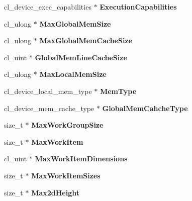 \begin{DoxyCompactItemize}
cl\+\_\+device\+\_\+exec\+\_\+capabilities $\ast$ {\bfseries Execution\+Capabilities}
\item 
\hypertarget{structdevices_a5ddc90720316ce7161f26263d83d4693}{}\label{structdevices_a5ddc90720316ce7161f26263d83d4693} 
cl\+\_\+ulong $\ast$ {\bfseries Max\+Global\+Mem\+Size}
\item 
\hypertarget{structdevices_a75e0abd182f71d9ccdacaefa759183e1}{}\label{structdevices_a75e0abd182f71d9ccdacaefa759183e1} 
cl\+\_\+ulong $\ast$ {\bfseries Max\+Global\+Mem\+Cache\+Size}
\item 
\hypertarget{structdevices_a6d9b4864fa0e86b5cfac50c34ed49bd3}{}\label{structdevices_a6d9b4864fa0e86b5cfac50c34ed49bd3} 
cl\+\_\+uint $\ast$ {\bfseries Global\+Mem\+Line\+Cache\+Size}
\item 
\hypertarget{structdevices_a55b41f48a237ce3e06b0d5f68f518ae9}{}\label{structdevices_a55b41f48a237ce3e06b0d5f68f518ae9} 
cl\+\_\+ulong $\ast$ {\bfseries Max\+Local\+Mem\+Size}
\item 
\hypertarget{structdevices_a0453d0dbf9d90d86ecb62c5cb23cbf5c}{}\label{structdevices_a0453d0dbf9d90d86ecb62c5cb23cbf5c} 
cl\+\_\+device\+\_\+local\+\_\+mem\+\_\+type $\ast$ {\bfseries Mem\+Type}
\item 
\hypertarget{structdevices_a93e65d571bcd11132e2f93ae2f3062ca}{}\label{structdevices_a93e65d571bcd11132e2f93ae2f3062ca} 
cl\+\_\+device\+\_\+mem\+\_\+cache\+\_\+type $\ast$ {\bfseries Global\+Mem\+Cahche\+Type}
\item 
\hypertarget{structdevices_a77489d32adab13bba6b5b38f1f4505ee}{}\label{structdevices_a77489d32adab13bba6b5b38f1f4505ee} 
size\+\_\+t $\ast$ {\bfseries Max\+Work\+Group\+Size}
\item 
\hypertarget{structdevices_aa500c0395fbaacdcfb07c6fb48b09c57}{}\label{structdevices_aa500c0395fbaacdcfb07c6fb48b09c57} 
size\+\_\+t $\ast$ {\bfseries Max\+Work\+Item}
\item 
\hypertarget{structdevices_af3747549c39fc0c0ce1dfe8c9ebf402a}{}\label{structdevices_af3747549c39fc0c0ce1dfe8c9ebf402a} 
cl\+\_\+uint $\ast$ {\bfseries Max\+Work\+Item\+Dimensions}
\item 
\hypertarget{structdevices_af79cf84f1d71d8481d3e04a79294d0ed}{}\label{structdevices_af79cf84f1d71d8481d3e04a79294d0ed} 
size\+\_\+t $\ast$ {\bfseries Max\+Work\+Item\+Sizes}
\item 
\hypertarget{structdevices_add04e0f60e2a9e3f67cceca10f8c3685}{}\label{structdevices_add04e0f60e2a9e3f67cceca10f8c3685} 
size\+\_\+t $\ast$ {\bfseries Max2d\+Height}
\item 

\end{DoxyCompactItemize}
